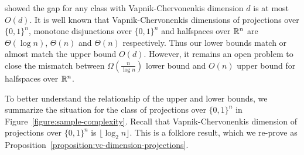 \cite{Darnstadt-Simon-Szorenyi-2013} showed the gap for any class with
Vapnik-Chervonenkis dimension $d$ is at most $O(d)$. It is well known that
Vapnik-Chervonenkis dimensions of projections over $\{0,1\}^n$, monotone
disjunctions over $\{0,1\}^n$ and halfspaces over $\mathbb{R}^n$ are $\Theta(\log n)$,
$\Theta(n)$ and $\Theta(n)$ respectively. Thus our lower bounds match or almost
match the upper bound $O(d)$. However, it remains an open problem to close the
mismatch between $\Omega(\frac{n}{\log n})$ lower bound and $O(n)$ upper bound
for halfspaces over $\mathbb{R}^n$.

To better understand the relationship of the upper and lower bounds, we
summarize the situation for the class of projections over $\{0,1\}^n$ in
Figure~\ref{figure:sample-complexity}. Recall that Vapnik-Chervonenkis dimension
of projections over $\{0,1\}^n$ is $\lfloor \log_2 n \rfloor$. This is a
folklore result, which we re-prove as
Proposition~\ref{proposition:vc-dimension-projections}.

